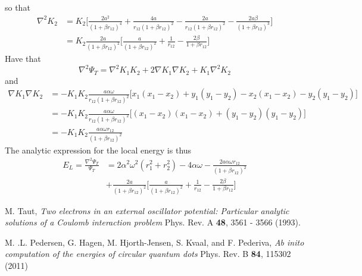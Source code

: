 \documentclass[english, a4paper]{article}
\begin{document}
so that
\begin{align}
 \nabla^2 K_2 &= K_2\Biggr[\frac{2a^2}{(1 + \beta r_{12})^4} + \frac{4a}{r_{12}(1 + \beta r_{12})^2}
              - \frac{2a}{r_{12}(1 + \beta r_{12})^2} - \frac{2a\beta}{(1 + \beta r_{12})^3} \Biggr] \\
              &= K_2\frac{2a}{(1+\beta r_{12})^2}\Biggr[ \frac{a}{(1+\beta r_{12})^2} + 
              \frac{1}{r_{12}} - \frac{2\beta}{1 + \beta r_{12}} \Biggr]
\end{align}
Have that
\begin{equation}
 \nabla^2 \Psi_T = \nabla^2K_1K_2 + 2\nabla K_1\nabla K_2 + K_1\nabla^2K_2
\end{equation}
and
\begin{align}
 \nabla K_1 \nabla K_2 &= -K_1K_2 \frac{a\alpha \omega}{r_{12}(1+\beta r_{12})^2}
 \Bigr[x_1(x_1 - x_2) + y_1(y_1 - y_2) - x_2(x_1 - x_2) - y_2(y_1 - y_2)\Bigr] \\
 &= -K_1K_2 \frac{a\alpha \omega}{r_{12}(1+\beta r_{12})^2}
 \Bigr[(x_1 - x_2)(x_1 - x_2) + (y_1 - y_2)(y_1 - y_2)\Bigr] \\
 &= -K_1K_2 \frac{a\alpha \omega r_{12}}{(1+\beta r_{12})^2}
\end{align}
The analytic expression for the local energy is thus
\begin{align}
 E_L = \frac{\nabla^2\Psi_T}{\Psi_T} &= 2\alpha^2 \omega^2(r_1^2 + r_2^2) - 4\alpha \omega
 - \frac{2a\alpha \omega r_{12}}{(1+\beta r_{12})^2} \\
 &+ \frac{2a}{(1+\beta r_{12})^2}\Biggr[ \frac{a}{(1+\beta r_{12})^2} + 
              \frac{1}{r_{12}} - \frac{2\beta}{1 + \beta r_{12}} \Biggr]
\end{align}



















\begin{thebibliography}{9}


 M. Taut, 
 \textit{Two electrons in an external oscillator potential: Particular analytic solutions
 of a Coulomb interaction problem}
 Phys. Rev. A {\bf 48}, 3561 - 3566 (1993).
 
 M. .L. Pedersen, G. Hagen, M. Hjorth-Jensen, S. Kvaal, and F. Pederiva, 
 \textit{Ab inito computation of the energies of circular quantum dots}
 Phys. Rev. B {\bf 84}, 115302 (2011)


\end{thebibliography}
\end{document}

